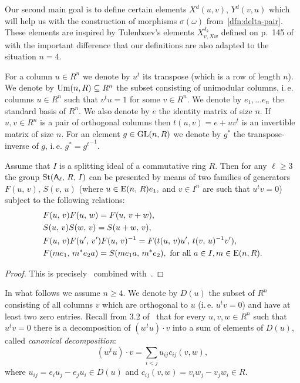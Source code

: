 Our second main goal is to define certain elements $X^d(u, v)$, $Y^d(v, u)$ which will help us
 with the construction of morphisms $\sigma(\omega)$ from~\cref{dfn:delta-pair}.
These elements are inspired by Tulenbaev's elements $X_{v, Xw}^{\delta_k}$ defined on p.~145 of~\cite{Tu83} with
 the important difference that our definitions are also adapted to the situation $n=4$.

For a column $u \in R^n$ we denote by $u^t$ its transpose (which is a row of length $n$).
We denote by $\operatorname{Um}(n, R) \subseteq R^n$ the subset consisting of unimodular columns,
i.\,e. columns $u \in R^n$ such that $v^t u = 1$ for some $v \in R^n$.
We denote by $e_1, \ldots e_n$ the standard basis of $R^n$.
We also denote by $e$ the identity matrix of size $n$.
If $u, v \in R^n$ is a pair of orthogonal columns then $t(u, v) = e + uv^t$ is an invertible matrix of size $n.$
For an element $g \in \operatorname{GL}(n, R)$ we denote by $g^*$ the transpose-inverse of $g$, i.\,e. $g^* = {g^{t}}^{-1}.$

\begin{prop}
    \label{prop:rel-presentation}
    Assume that $I$ is a splitting ideal of a commutative ring $R$.
    Then for any $\ell\geq 3$ the group $\operatorname{St}(\mathsf{A}_\ell,\,R,\,I)$ can be presented by means of two families of generators $F(u,\,v)$, $S(v,\,u)$
    (where $u\in \operatorname{E}(n,\,R)e_1,$ and $v\in I^n$ are such that $u^{t}v=0$) subject to the following relations:
    \begin{align}
        &F(u,\,v)F(u,\,w)=F(u,\,v+w), \label{add4}\\
        &S(u,\,v)S(w,\,v)=S(u+w,\,v), \label{add5}\\
        &F(u,\,v)F(u',\,v')F(u,\,v)^{-1}=F(t(u,\,v)u',\,t(v,\,u)^{-1} v'), \label{conj3} \\
        &F(me_1,\,m^{*}e_{2}a)=S(me_{1}a,\,m^{*}e_{2}),\ \text{for all $a\in I$,}\, m \in \operatorname{E}(n, R). \label{coef-move}
    \end{align}
\end{prop}
\begin{proof}
    This is precisely~\cite[Proposition 3.10]{LS17} combined with~\cite[Proposition~8]{S15}.
\end{proof}

In what follows we assume $n \geq 4$.
We denote by $D(u)$ the subset of $R^n$ consisting of all columns $v$ which are orthogonal to $u$
(i.\,e. $u^{t} v = 0$) and have at least two zero entries.
Recall from 3.2 of~\cite{Ka77} that for every $u, v, w \in R^n$ such that $u^t v = 0$ there
is a decomposition of $(w^t u) \cdot v$ into a sum of elements of $D(u)$, called \textit{canonical decomposition}:
\begin{equation}
    \label{eq:canonical} (w^tu) \cdot v=\sum_{i<j}u_{ij} c_{ij}(v, w),
\end{equation}
where $u_{ij} =e_i u_j-e_j u_i \in D(u)$ and $c_{ij}(v, w) =v_i w_j-v_j w_i \in R$.

